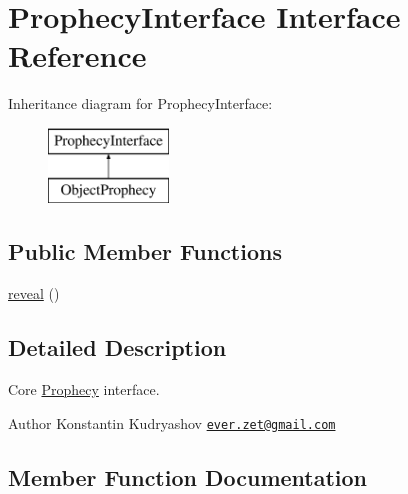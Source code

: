 \hypertarget{interface_prophecy_1_1_prophecy_1_1_prophecy_interface}{}\section{Prophecy\+Interface Interface Reference}
\label{interface_prophecy_1_1_prophecy_1_1_prophecy_interface}
Inheritance diagram for Prophecy\+Interface\+:\begin{figure}[H]
\begin{center}
\leavevmode
\includegraphics[height=2.000000cm]{interface_prophecy_1_1_prophecy_1_1_prophecy_interface}
\end{center}
\end{figure}
\subsection*{Public Member Functions}
\begin{DoxyCompactItemize}
\item 
\mbox{\hyperlink{interface_prophecy_1_1_prophecy_1_1_prophecy_interface_a95807c4aeec3dd185c70249cea8a0ea8}{reveal}} ()
\end{DoxyCompactItemize}


\subsection{Detailed Description}
Core \mbox{\hyperlink{namespace_prophecy_1_1_prophecy}{Prophecy}} interface.

\begin{DoxyAuthor}{Author}
Konstantin Kudryashov \href{mailto:ever.zet@gmail.com}{\tt ever.\+zet@gmail.\+com} 
\end{DoxyAuthor}


\subsection{Member Function Documentation}
\mbox{\label{interface_prophecy_1_1_prophecy_1_1_prophecy_interface_a95807c4aeec3dd185c70249cea8a0ea8}} 

